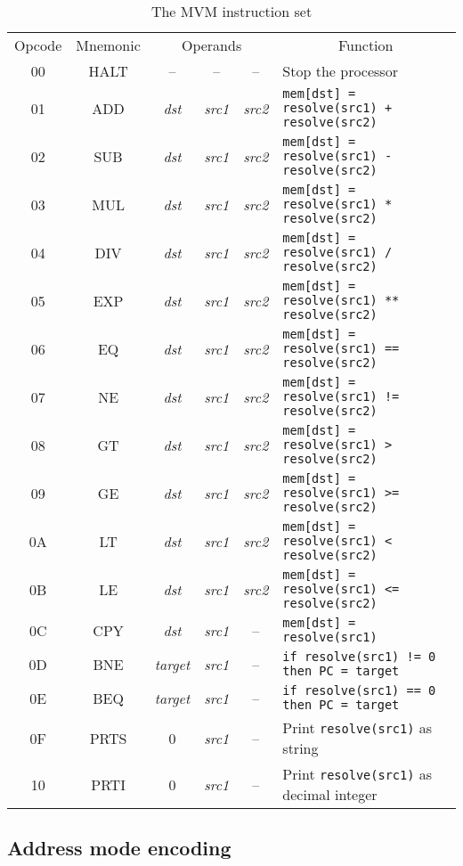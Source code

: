 \begin{table} \hspace*{-1.5cm}\begin{tabular}{cccccl}
Opcode&Mnemonic&\multicolumn{3}{c}{Operands}&\multicolumn{1}{c}{Function}\\
00&HALT&--&--&--&Stop the processor\\
01&ADD&{\em dst}&{\em src1}&{\em src2}&\tt mem[dst] = resolve(src1) + resolve(src2)\\
02&SUB&{\em dst}&{\em src1}&{\em src2}&\tt mem[dst] = resolve(src1) - resolve(src2)\\
03&MUL&{\em dst}&{\em src1}&{\em src2}&\tt mem[dst] = resolve(src1) * resolve(src2)\\
04&DIV&{\em dst}&{\em src1}&{\em src2}&\tt mem[dst] = resolve(src1) / resolve(src2)\\
05&EXP&{\em dst}&{\em src1}&{\em src2}&\tt mem[dst] = resolve(src1) ** resolve(src2)\\
06&EQ&{\em dst}&{\em src1}&{\em src2}&\tt mem[dst] = resolve(src1) == resolve(src2)\\
07&NE&{\em dst}&{\em src1}&{\em src2}&\tt mem[dst] = resolve(src1) != resolve(src2)\\
08&GT&{\em dst}&{\em src1}&{\em src2}&\tt mem[dst] = resolve(src1) > resolve(src2)\\
09&GE&{\em dst}&{\em src1}&{\em src2}&\tt mem[dst] = resolve(src1) >= resolve(src2)\\
0A&LT&{\em dst}&{\em src1}&{\em src2}&\tt mem[dst] = resolve(src1) < resolve(src2)\\
0B&LE&{\em dst}&{\em src1}&{\em src2}&\tt mem[dst] = resolve(src1) <= resolve(src2)\\
0C&CPY&{\em dst}&{\em src1}&--&\tt mem[dst] = resolve(src1)\\
0D&BNE&{\em target}&\em src1&--&\tt if resolve(src1) != 0 then PC = target\\
0E&BEQ&{\em target}&\em src1&--&\tt if resolve(src1) == 0 then PC = target\\
0F&PRTS&0&\em src1&--&Print {\tt resolve(src1)} as string\\
10&PRTI&0&\em src1&--&Print {\tt resolve(src1)} as decimal integer\\
\end{tabular}
\caption{The MVM instruction set} \label{MVM:instr} \end{table}

\subsection{Address mode encoding}


